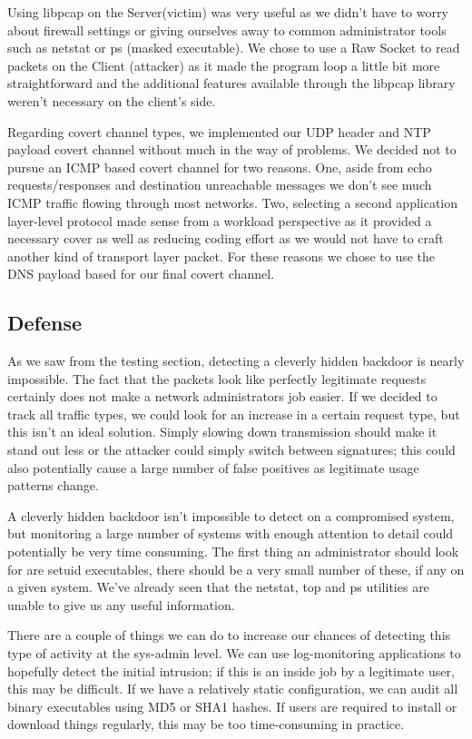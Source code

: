 \documentclass[titlepage]{article}
\begin{document}
Using libpcap on the Server(victim) was very useful as we didn't have to worry about firewall settings or giving ourselves away to common administrator tools such as netstat or ps (masked executable).  We chose to use a Raw Socket to read packets on the Client (attacker) as it made the program loop a little bit more straightforward and the additional features available through the libpcap library weren't necessary on the client's side.

Regarding covert channel types, we implemented our UDP header and NTP payload covert channel without much in the way of problems.  We decided not to pursue an ICMP based covert channel for two reasons. One, aside from echo requests/responses and destination unreachable messages we don't see much ICMP traffic flowing through most networks. Two, selecting a second application layer-level protocol made sense from a workload perspective as it provided a necessary cover as well as reducing coding effort as we would not have to craft another kind of transport layer packet.  For these reasons we chose to use the DNS payload based for our final covert channel.

\subsection{Defense}

As we saw from the testing section, detecting a cleverly hidden backdoor is nearly impossible.  The fact that the packets look like perfectly legitimate requests certainly does not make a network administrators job easier. If we decided to track all traffic types, we could look for an increase in a certain request type, but this isn't an ideal solution. Simply slowing down transmission should make it stand out less or the attacker could simply switch between signatures; this could also potentially cause a large number of false positives as legitimate usage patterns change.

A cleverly hidden backdoor isn't impossible to detect on a compromised system, but monitoring a large number of systems with enough attention to detail could potentially be very time consuming.  The first thing an administrator should look for are setuid executables, there should be a very small number of these, if any on a given system.  We've already seen that the netstat, top and ps utilities are unable to give us any useful information. 

There are a couple of things we can do to increase our chances of detecting this type of activity at the sys-admin level. We can use log-monitoring applications to hopefully detect the initial intrusion; if this is an inside job by a legitimate user, this may be difficult.  If we have a relatively static configuration, we can audit all binary executables using MD5 or SHA1 hashes. If users are required to install or download things regularly, this may be too time-consuming in practice.
\end{document}
